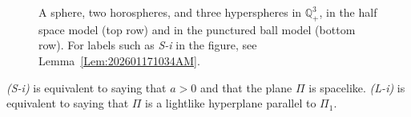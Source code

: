 \documentclass[12pt,reqno]{amsart}
\theoremstyle{plain} %
\theoremstyle{definition}
\numberwithin{equation}{section}
\newcommand{\qthreep}{\mathbb{Q}^3_+}
\begin{document}
\begin{figure}[t]
\begin{center}
%
  \hfill
{}%
  \hfill
{}
  \bigskip
{}%
  \hfill
{}%
  \hfill
{}
  \caption{
    A sphere, two horospheres, and three hyperspheres in $\qthreep$, in the half space model (top row) and in the punctured ball model (bottom row). For labels such as {\it S-i} in the figure, see Lemma~\ref{Lem:202601171034AM}.
  }
\label{Fig:202603160953PM} 
\end{center}
\end{figure}



\textit{ (S-i) } is equivalent to saying that $a>0$ and that the plane $\Pi$ is spacelike.
\textit{(L-i) } is equivalent to saying that $\Pi$ is a lightlike hyperplane parallel to $\Pi_1$.
\end{document}
